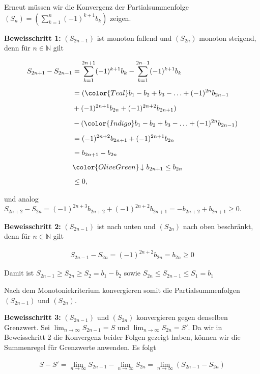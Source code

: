 \documentclass[fontsize=9pt,
               parskip=half-,
               DIV=14,
               listof=chapterentry,
               tocflat]{scrbook}
\begin{document}
\begin{proof*}
Erneut müssen wir die Konvergenz der Partialsummenfolge $(S_{n})=\left(\sum _{k=1}^{n}(-1)^{k+1}b_{k}\right)$ zeigen.

\textbf{Beweisschritt 1:} $(S_{2n-1})$ ist monoton fallend und $(S_{2n})$ monoton steigend, denn für $n\in \mathbb {N} $ gilt

\begin{align*}
S_{2n+1}-S_{2n-1}&=\sum _{k=1}^{2n+1}(-1)^{k+1}b_{k}-\sum _{k=1}^{2n-1}(-1)^{k+1}b_{k}\\[0.5em]&=({\color {Teal}b_{1}-b_{2}+b_{3}-\ldots +(-1)^{2n}b_{2n-1}}\\[0.5em]&+(-1)^{2n+1}b_{2n}+(-1)^{2n+2}b_{2n+1})\\[0.5em]&-({\color {Indigo}b_{1}-b_{2}+b_{3}-\ldots +(-1)^{2n}b_{2n-1}})\\[0.5em]&=(-1)^{2n+2}b_{2n+1}+(-1)^{2n+1}b_{2n}\\[0.5em]&=b_{2n+1}-b_{2n}\\[0.5em]&{\color {OliveGreen}\left\downarrow \ b_{2n+1}\leq b_{2n}\right.}\\[0.5em]&\leq 0,
\end{align*}

und analog $S_{2n+2}-S_{2n}=(-1)^{2n+3}b_{2n+2}+(-1)^{2n+2}b_{2n+1}=-b_{2n+2}+b_{2n+1}\geq 0$.

\textbf{Beweisschritt 2:} $(S_{2n-1})$ ist nach unten und $(S_{2n})$ nach oben beschränkt, denn für $n\in \mathbb {N} $ gilt

\begin{align*}
S_{2n-1}-S_{2n}=(-1)^{2n+2}b_{2n}=b_{2n}\geq 0
\end{align*}

Damit ist $S_{2n-1}\geq S_{2n}\geq S_{2}=b_{1}-b_{2}$ sowie $S_{2n}\leq S_{2n-1}\leq S_{1}=b_{1}$

Nach dem Monotoniekriterium konvergieren somit die Partialsummenfolgen $(S_{2n-1})$ und $(S_{2n})$.

\textbf{Beweisschritt 3:} $(S_{2n-1})$ und $(S_{2n})$ konvergieren gegen denselben Grenzwert. Sei $\lim _{n\to \infty }S_{2n-1}=S$ und $\lim _{n\to \infty }S_{2n}=S'$. Da wir in Beweisschritt 2 die Konvergenz beider Folgen gezeigt haben, können wir die Summenregel für Grenzwerte anwenden. Es folgt

\begin{align*}
S-S'=\lim _{n\to \infty }S_{2n-1}-\lim _{n\to \infty }S_{2n}=\lim _{n\to \infty }(S_{2n-1}-S_{2n})
\end{align*}


\end{proof*}
\end{document}
